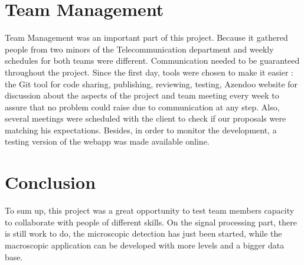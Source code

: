 %
%
\section{Team Management}

Team Management was an important part of this project. Because it gathered people from two minors of the Telecommunication department and weekly schedules for both teams were different. Communication needed to be guaranteed throughout the project. Since the first day, tools were chosen to make it easier : the Git tool for code sharing, publishing, reviewing, testing, Azendoo website for discussion about the aspects of the project and team meeting every week to assure that no problem could raise due to communication at any step. Also, several meetings were scheduled with the client to check if our proposals were matching his expectations. Besides, in order to monitor the development, a testing version of the webapp was made available online.\\

\section{Conclusion}

To sum up, this project was a great opportunity to test team members capacity to collaborate with people of different skills. On the signal processing part, there is still work to do, the microscopic detection has just been started, while the macroscopic application can be developed with more levels and a bigger data base.

%
%
%

